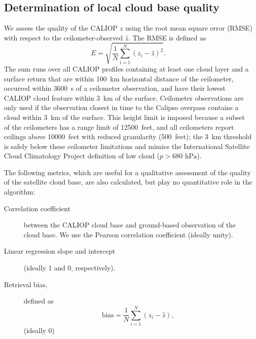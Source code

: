 \documentclass[essd,manuscript]{copernicus}\usepackage[]{graphicx}\usepackage[]{color}
\newcommand\CBH{\ensuremath{z}}
\begin{document}
\subsection{Determination of local cloud base quality}
\label{sec:algorithm:qual}
We assess the quality of the CALIOP \CBH{} using the root mean square error
(RMSE) with respect to the
ceilometer-observed $\hat{z}$.  The RMSE is defined as
\begin{equation}
  \label{eq:rmse}
  E = \sqrt{\frac{1}{N}\sum\limits_{i = 1}^{N}\left(z_i - \hat{z}\right)^2}.
\end{equation}
The sum runs over all CALIOP profiles containing at least one cloud layer and a
surface return that are within 100~km horizontal distance of the ceilometer,
occurred within 3600~s of a ceilometer observation, and have their lowest CALIOP
cloud feature within 3~km of the surface.  Ceilometer observations are only used
if the observation closest in time to the Calipso overpass contains a cloud
within 3~km of the surface.  This height limit is imposed because a subset of
the ceilometers has a range limit of 12500~feet, and all ceilometers report
ceilings above 10000~feet with reduced granularity (500~feet); the 3~km
threshold is safely below these ceilometer limitations and mimics the
International Satellite Cloud Climatology Project \citep[ISCCP,][]{Rossow1999}
definition of low cloud ($p > 680\text{ hPa}$).

The following metrics, which are useful for a qualitative assessment of the
quality of the satellite cloud base, are also calculated, but play no
quantitative role in the algorithm:
\begin{description}
\item[Correlation coefficient] between the CALIOP cloud base and ground-based
  observation of the cloud base.  We use the Pearson correlation coefficient
  (ideally unity).  
\item[Linear regression slope and intercept] (ideally 1 and 0, respectively).  
\item[Retrieval bias,] defined as
  \begin{equation}
    \label{eq:bias}
    \mbox{bias} = \frac{1}{N}\sum\limits_{i = 1}^{N}\left(z_i - \hat{z}\right),
  \end{equation}(ideally 0)
\end{description}
\end{document}
